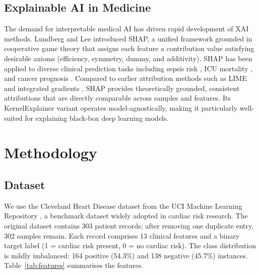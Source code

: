 \documentclass[conference]{IEEEtran}
\begin{document}
\subsection{Explainable AI in Medicine}

The demand for interpretable medical AI has driven rapid development of XAI methods. Lundberg and Lee \cite{lundberg2017unified} introduced SHAP, a unified framework grounded in cooperative game theory that assigns each feature a contribution value satisfying desirable axioms (efficiency, symmetry, dummy, and additivity). SHAP has been applied to diverse clinical prediction tasks including sepsis risk \cite{lundberg2018consistent}, ICU mortality \cite{thorsen2020dynamic}, and cancer prognosis \cite{chen2020interpretable}. Compared to earlier attribution methods such as LIME \cite{ribeiro2016should} and integrated gradients \cite{sundararajan2017axiomatic}, SHAP provides theoretically grounded, consistent attributions that are directly comparable across samples and features. Its KernelExplainer variant operates model-agnostically, making it particularly well-suited for explaining black-box deep learning models.

\section{Methodology}
\label{sec:methodology}

\subsection{Dataset}

We use the Cleveland Heart Disease dataset from the UCI Machine Learning Repository \cite{detrano1989international}, a benchmark dataset widely adopted in cardiac risk research. The original dataset contains 303 patient records; after removing one duplicate entry, 302 samples remain. Each record comprises 13 clinical features and a binary target label (1 = cardiac risk present, 0 = no cardiac risk). The class distribution is mildly imbalanced: 164 positive (54.3\%) and 138 negative (45.7\%) instances. Table~\ref{tab:features} summarises the features.
\end{document}
